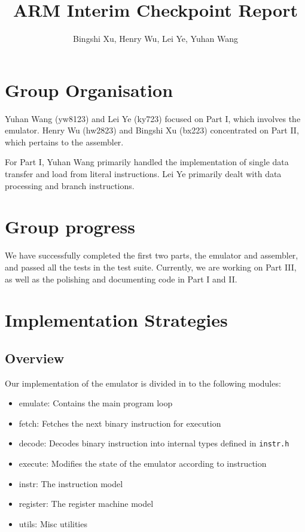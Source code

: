 \documentclass[11pt]{article}
\begin{document}
\title{ARM Interim Checkpoint Report}
\author{Bingshi Xu, Henry Wu, Lei Ye, Yuhan Wang}

\maketitle

\section{Group Organisation}

Yuhan Wang (yw8123) and Lei Ye (ky723) focused on Part I, which involves the
emulator. Henry Wu (hw2823) and Bingshi Xu (bx223) concentrated on Part II,
which pertains to the assembler.

For Part I, Yuhan Wang primarily handled the implementation of single data
transfer and load from literal instructions. Lei Ye primarily dealt with data
processing and branch instructions.

\section{Group progress}
We have successfully completed the first two parts, the emulator and assembler,
and passed all the tests in the test suite. Currently, we are working on Part
III, as well as the polishing and documenting code in Part I and II.

\section{Implementation Strategies}

\subsection{Overview}
Our implementation of the emulator is divided in to the following modules:
\begin{itemize}
	\item{emulate:} Contains the main program loop
	\item{fetch:} Fetches the next binary instruction for execution
	\item{decode:} Decodes binary instruction into internal types defined in \texttt{instr.h}
	\item{execute:} Modifies the state of the emulator according to instruction
	\item{instr:} The instruction model
	\item{register:} The register machine model
	\item{utils:} Misc utilities
\end{itemize}
\end{document}
